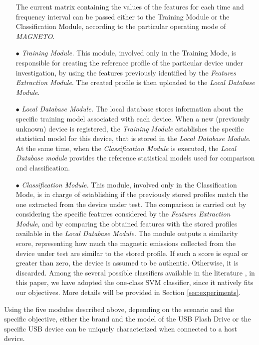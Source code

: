 \documentclass[acmsmall, authorversion]{acmart}
\newcommand{\sol}{\emph{MAGNETO}}
\begin{document}
\begin{itemize}
    
    The current matrix containing the values of the features for each time and frequency interval can be passed either to the Training Module or the Classification Module, according to the particular operating mode of \sol.
    \item[$\bullet$] \emph{Training Module.} This module, involved only in the Training Mode, is responsible for creating the reference profile of the particular device under investigation, by using the features previously identified by the \emph{Features Extraction Module}. The created profile is then uploaded to the \emph{Local Database Module}.
    \item[$\bullet$] \emph{Local Database Module.} The local database stores information about the specific training model associated with each device. When a new (previously unknown) device is registered, the \emph{Training Module} establishes the specific statistical model for this device, that is stored in the \emph{Local Database Module}. At the same time, when the \emph{Classification Module} is executed, the \emph{Local Database module} provides the reference statistical models used for comparison and classification. 
    \item[$\bullet$] \emph{Classification Module.} This module, involved only in the Classification Mode, is in charge of establishing if the previously stored profiles match the one extracted from the device under test. The comparison is carried out by considering the specific features considered by the \emph{Features Extraction Module}, and by comparing the obtained features with the stored profiles available in the \emph{Local Database Module}. The module outputs a similarity score, representing how much the magnetic emissions collected from the device under test are similar to the stored profile. If such a score is equal or greater than zero, the device is assumed to be authentic. Otherwise, it is discarded. 
    Among the several possible classifiers available in the literature \cite{Shabtai2009}, in this paper, we have adopted the one-class \ac{SVM} classifier, since it natively fits our objectives. More details will be provided in Section \ref{sec:experiments}.  
    
\end{itemize}

Using the five modules described above, depending on the scenario and the specific objective, either the brand and the model of the USB Flash Drive or the specific USB device can be uniquely characterized when connected to a host device. 
\end{document}
